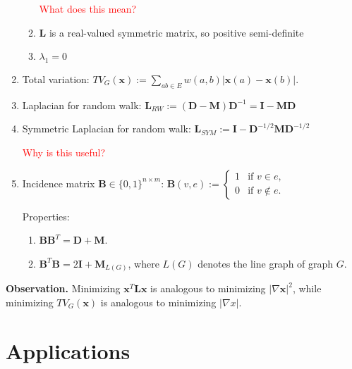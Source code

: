 \documentclass[11pt,letterpaper]{article}
\begin{document}
\begin{enumerate}[label=(\alph*)]
\begin{enumerate}[label=(\arabic*)]
    \textcolor{red}{What does this mean?}

    \item $\bm{L}$ is a real-valued symmetric matrix, so positive semi-definite
    \item $\lambda_1=0$
  \end{enumerate}
  
  \item Total variation: $TV_G(\bm{x}) := \sum_{ab \in E} w(a,b) \left|\bm{x}(a) - \bm{x}(b)\right|$.
  \item Laplacian for random walk: $\bm{L}_{RW} := (\bm{D}-\bm{M})\bm{D}^{-1} = \bm{I} - \bm{M}\bm{D}$
  \item Symmetric Laplacian for random walk: $\bm{L}_{SYM} := \bm{I} - \bm{D}^{-1/2}\bm{M}\bm{D}^{-1/2}$

  \textcolor{red}{Why is this useful?}

  \item Incidence matrix $\bm{B} \in \{0,1\}^{n \times m}$: $\bm{B}(v,e) := \begin{cases}
    1 &\text{if } v \in e,\\
    0 &\text{if } v \notin e.
  \end{cases}$

  Properties:
  \begin{enumerate}[label=(\arabic*)]
  \item $\bm{B}\bm{B}^T = \bm{D} + \bm{M}$.
  \item $\bm{B}^T \bm{B}=2\bm{I} + \bm{M}_{L(G)}$, where $L(G)$ denotes the line graph of graph $G$.
  \end{enumerate}
\end{enumerate}

\textbf{Observation.} Minimizing $\bm{x}^T\bm{L}\bm{x}$ is analogous to minimizing $|\nabla \bm{x}|^2$,
while minimizing $TV_G(\bm{x})$ is analogous to minimizing $|\nabla x|$.

\section{Applications}
\end{document}
